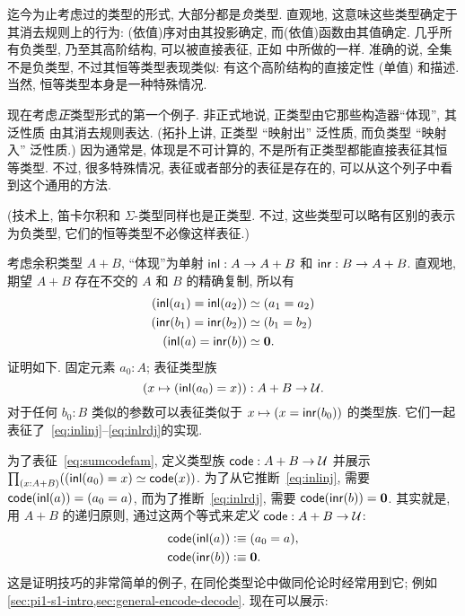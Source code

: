 %
%
迄今为止考虑过的类型的形式, 大部分都是\emph{负}类型.
%
%
直观地, 这意味这些类型确定于其消去规则上的行为: (依值)序对由其投影确定, 而(依值)函数由其值确定.
几乎所有负类型, 乃至其高阶结构, 可以被直接表征, 正如 中所做的一样.
准确的说, 全集不是负类型, 不过其恒等类型表现类似: 有这个高阶结构的直接定性 (单值) 和描述.
当然, 恒等类型本身是一种特殊情况.

现在考虑\emph{正}类型形式的第一个例子.
%
非正式地说, 正类型由它那些构造器``体现'', 其泛性质 由其消去规则表达.
(拓扑上讲, 正类型 ``映射出'' 泛性质, 而负类型 ``映射入'' 泛性质.)
因为通常是, 体现是不可计算的, 不是所有正类型都能直接表征其恒等类型.
不过, 很多特殊情况, 表征或者部分的表征是存在的, 可以从这个列子中看到这个通用的方法.

(技术上, 笛卡尔积和 $\Sigma$-类型同样也是正类型.
不过, 这些类型可以略有区别的表示为负类型, 它们的恒等类型不必像这样表征.)

考虑余积类型 $A+B$, ``体现''为单射 ${\mathsf{inl}}:A\to A+B$ 和 ${\mathsf{inr}}:B\to A+B$.
直观地, 期望 $A+B$ 存在不交的 $A$ 和 $B$ 的精确复制, 所以有
\begin{align}
{(\inl(a_1)=\inl(a_2))}
    &\eqvsym {(a_1=a_2)} \label{eq:inlinj}\\
    {(\inr(b_1)=\inr(b_2))}&\eqvsym {(b_1=b_2)}\\
    {(\inl(a)= \inr(b))} &\eqvsym {\emptyt}. \label{eq:inlrdj}
\end{align}
证明如下.
固定元素 $a_0:A$; 表征类型族
\begin{equation}
(x\mapsto (\inl(a_0)=x))
    : A+B \to \type.\label{eq:sumcodefam}
\end{equation}
对于任何 $b_0:B$ 类似的参数可以表征类似于 $x\mapsto (x = {\mathsf{inr}}(b_0))$ 的类型族.
它们一起表征了~\eqref{eq:inlinj}--\eqref{eq:inlrdj}的实现.

为了表征~\eqref{eq:sumcodefam}, 定义类型族 $\mathsf{code}:A+B\to\mathcal{U}$ 并展示 $\prd{x:A+B} (\eqv{(\inl(a_0)=x)}{\code(x)})$.
为了从它推断~\eqref{eq:inlinj}, 需要 $\mathsf{code}({\mathsf{inl}}(a)) = (a_0=a)$, 而为了推断~\eqref{eq:inlrdj}, 需要 $\mathsf{code} ({\mathsf{inr}}(b)) = \mathbf{0}$.
其实就是, 用 $A+B$ 的递归原则, 通过这两个等式来\emph{定义} $\mathsf{code}:A+B\to\mathcal{U}$:
\begin{align*}
    \mathsf{code}({\mathsf{inl}}(a)) &\vcentcolon\equiv (a_0=a),\\
    \mathsf{code}({\mathsf{inr}}(b)) &\vcentcolon\equiv \mathbf{0}.
\end{align*}
这是证明技巧的非常简单的例子, 在同伦类型论中做同伦论时经常用到它;
例如 \cref{sec:pi1-s1-intro,sec:general-encode-decode}.
%
现在可以展示:

